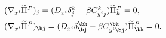 \begin{equation}
\begin{array}{l}
(\nabla_{x^i}\widetilde{\Pi}^P)_j=(D_{x^i}\delta^k_j-\beta C_{y^ij}^k)
\widetilde{\Pi}^P_k=0,
\\[0.2cm]
(\nabla_{x^i}\widetilde{\Pi}^P)_{\bj}=(D_{x^i}\delta^{\bk}_{\bj}
-\beta C_{y^i\bj}^{\bk})\widetilde{\Pi}^P_{\bk}=0.
\end{array}
\label{parallel2}
\end{equation}

